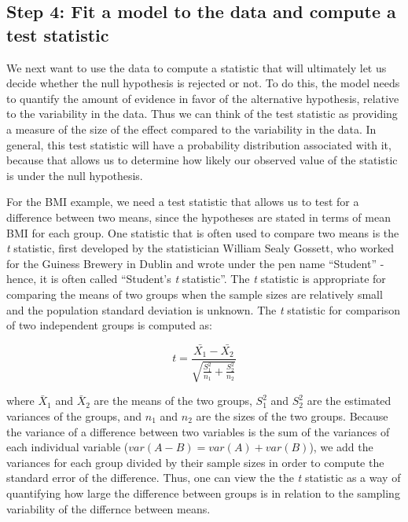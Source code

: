 \documentclass[12pt,]{book}
\theoremstyle{definition}
\theoremstyle{definition}
\theoremstyle{definition}
\theoremstyle{remark}
\begin{document}
\hypertarget{step-4-fit-a-model-to-the-data-and-compute-a-test-statistic}{%
\subsection{Step 4: Fit a model to the data and compute a test statistic}\label{step-4-fit-a-model-to-the-data-and-compute-a-test-statistic}}

We next want to use the data to compute a statistic that will ultimately let us decide whether the null hypothesis is rejected or not. To do this, the model needs to quantify the amount of evidence in favor of the alternative hypothesis, relative to the variability in the data. Thus we can think of the test statistic as providing a measure of the size of the effect compared to the variability in the data. In general, this test statistic will have a probability distribution associated with it, because that allows us to determine how likely our observed value of the statistic is under the null hypothesis.

For the BMI example, we need a test statistic that allows us to test for a difference between two means, since the hypotheses are stated in terms of mean BMI for each group. One statistic that is often used to compare two means is the \emph{t} statistic, first developed by the statistician William Sealy Gossett, who worked for the Guiness Brewery in Dublin and wrote under the pen name ``Student'' - hence, it is often called ``Student's \emph{t} statistic''. The \emph{t} statistic is appropriate for comparing the means of two groups when the sample sizes are relatively small and the population standard deviation is unknown. The \emph{t} statistic for comparison of two independent groups is computed as:

\[
t = \frac{\bar{X_1} - \bar{X_2}}{\sqrt{\frac{S_1^2}{n_1} + \frac{S_2^2}{n_2}}}
\]

where \(\bar{X}_1\) and \(\bar{X}_2\) are the means of the two groups, \(S^2_1\) and \(S^2_2\) are the estimated variances of the groups, and \(n_1\) and \(n_2\) are the sizes of the two groups. Because the variance of a difference between two variables is the sum of the variances of each individual variable (\(var(A - B) = var(A) + var(B)\)), we add the variances for each group divided by their sample sizes in order to compute the standard error of the difference. Thus, one can view the the \emph{t} statistic as a way of quantifying how large the difference between groups is in relation to the sampling variability of the differnce between means.
\end{document}

